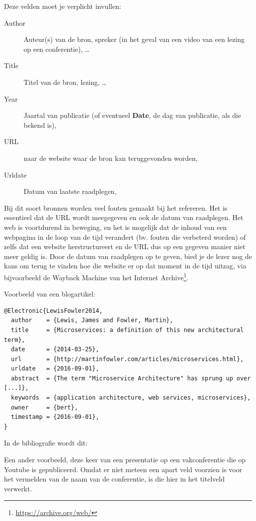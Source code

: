 Deze velden moet je verplicht invullen:

\begin{description}
  \item[Author] Auteur(s) van de bron, spreker (in het geval van een video van een lezing op een conferentie), \ldots
  \item[Title] Titel van de bron, lezing, \ldots
  \item[Year] Jaartal van publicatie (of eventueel \textbf{Date}, de dag van publicatie, als die bekend is),
  \item[URL] naar de website waar de bron kan teruggevonden worden,
  \item[Urldate] Datum van laatste raadplegen,
\end{description}

Bij dit soort bronnen worden veel fouten gemaakt bij het refereren. Het is essentieel dat de URL wordt meegegeven en ook de datum van raadplegen. Het web is voortdurend in beweging, en het is mogelijk dat de inhoud van een webpagina in de loop van de tijd verandert (bv. fouten die verbeterd worden) of zelfs dat een website herstructureert en de URL dus op een gegeven manier niet meer geldig is. Door de datum van raadplegen op te geven, bied je de lezer nog de kans om terug te vinden hoe die website er op dat moment in de tijd uitzag, via bijvoorbeeld de Wayback Machine van het Internet Archive\footnote{\url{https://archive.org/web/}}.

Voorbeeld van een blogartikel:

\begin{verbatim}
@Electronic{LewisFowler2014,
  author    = {Lewis, James and Fowler, Martin},
  title     = {Microservices: a definition of this new architectural term},
  date      = {2014-03-25},
  url       = {http://martinfowler.com/articles/microservices.html},
  urldate   = {2016-09-01},
  abstract  = {The term "Microservice Architecture" has sprung up over [...]},
  keywords  = {application architecture, web services, microservices},
  owner     = {bert},
  timestamp = {2016-09-01},
}
\end{verbatim}

In de bibliografie wordt dit: 

Een ander voorbeeld, deze keer van een presentatie op een vakconferentie die op Youtube is gepubliceerd. Omdat er niet meteen een apart veld voorzien is voor het vermelden van de naam van de conferentie, is die hier in het titelveld verwerkt.

